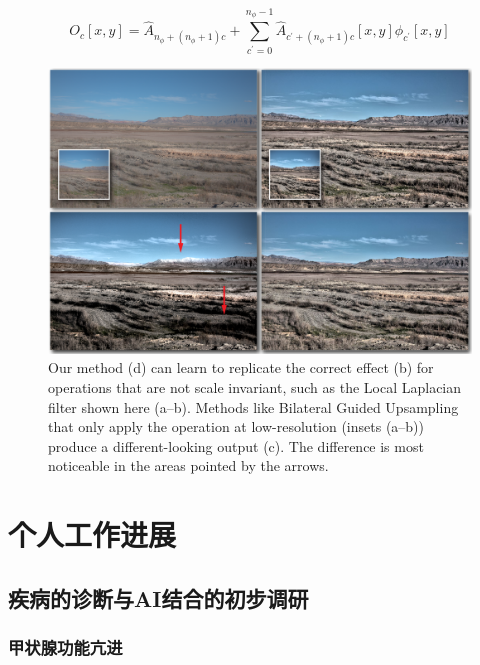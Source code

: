 \documentclass[letterpaper,12pt]{article}
\begin{document}
		\begin{equation}\label{eq:Computation of affine parameters } %
			O_c\left[x,y\right]={\hat{A}}_{n_\phi+\left(n_\phi+1\right)c}+\sum_{c^\prime=0}^{n_\phi-1}{\hat{A}}_{c^\prime+\left(n_\phi+1\right)c}\left[x,y\right]\phi_{c^\prime}\left[x,y\right]
		\end{equation}
		
			\begin{figure}[ht] 
			\centering
			\includegraphics[width=0.8\columnwidth]{method_2017}
			\captionsetup{font=scriptsize}
			\caption{
				\label{fig:method 2017} %
				Our method (d) can learn to replicate the correct effect (b) for operations that are not scale invariant, such as the Local Laplacian filter shown here (a–b). Methods like Bilateral Guided Upsampling that only apply the operation at low-resolution (insets (a–b)) produce a different-looking output (c). The difference is most noticeable in the areas pointed by the arrows.}
			\end{figure}
			
	\section{个人工作进展}
	
		\subsection{疾病的诊断与AI结合的初步调研}
		
			\subsubsection{甲状腺功能亢进}
			
\end{document}
